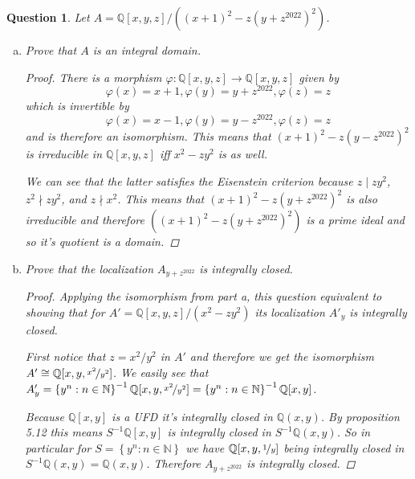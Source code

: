 \documentclass{article}
\newcommand{\N}{\mathbb{N}}
\newcommand{\Q}{\mathbb{Q}}
\newcommand{\setwith}[2]{\left\{#1:#2\right\}}
\newtheorem{question}{Question}
\theoremstyle{definition}
\begin{document}
\begin{question}
    Let \(A=\Q[x,y,z]/((x+1)^{2}-z(y+z^{2022})^{2})\).
    \begin{enumerate}[(a)]
        \item Prove that \(A\) is an integral domain.

              \begin{proof}
                  There is a morphism \(\varphi:\Q[x,y,z]\to\Q[x,y,z]\) given by
                  \[
                      \varphi(x)=x+1,\varphi(y)=y+z^{2022},\varphi(z)=z
                  \]
                  which is invertible by
                  \[
                      \varphi(x)=x-1,\varphi(y)=y-z^{2022},\varphi(z)=z
                  \]
                  and is therefore an isomorphism. This means that
                  \((x+1)^{2}-z(y-z^{2022})^{2}\) is irreducible in
                  \(\Q[x,y,z]\) iff \(x^{2}-zy^{2}\) is as well.

                  We can see that the latter satisfies the Eisenstein criterion
                  because \(z\mid zy^{2}\), \(z^{2}\nmid zy^{2}\), and \(z\nmid
                  x^{2}\). This means that \((x+1)^{2}-z(y+z^{2022})^{2}\) is
                  also irreducible and therefore
                  \(((x+1)^{2}-z(y+z^{2022})^{2})\) is a prime ideal and so it's
                  quotient is a domain.
              \end{proof}

        \item Prove that the localization \(A_{y+z^{2022}}\) is integrally
              closed.

              \begin{proof}
                  Applying the isomorphism from part a, this question equivalent
                  to showing that for \(A'=\Q[x,y,z]/(x^{2}-zy^{2})\) its
                  localization \(A'_{y}\) is integrally closed.

                  First notice that \(z=x^{2}/y^{2}\) in \(A'\) and therefore we
                  get the isomorphism \(A'\cong
                  \Q[x,y,\nicefrac{x^{2}}{y^{2}}]\). We easily see that
                  \(A'_{y}=\setwith{y^{n}}{n\in\N}^{-1}\Q[x,y,\nicefrac{x^{2}}{y^{2}}]=\setwith{y^{n}}{n\in\N}^{-1}\Q[x,y]\).

                  Because \(\Q[x,y]\) is a UFD it's integrally closed in
                  \(\Q(x,y)\). By proposition 5.12 this means \(S^{-1}\Q[x,y]\)
                  is integrally closed in \(S^{-1}\Q(x,y)\). So in particular
                  for \(S=\setwith{y^{n}}{n\in\N}\) we have
                  \(\Q[x,y,\nicefrac{1}{y}]\) being integrally closed in
                  \(S^{-1}\Q(x,y)=\Q(x,y)\). Therefore \(A_{y+z^{2022}}\) is
                  integrally closed.
              \end{proof}


\end{enumerate}
\end{question}
\end{document}
